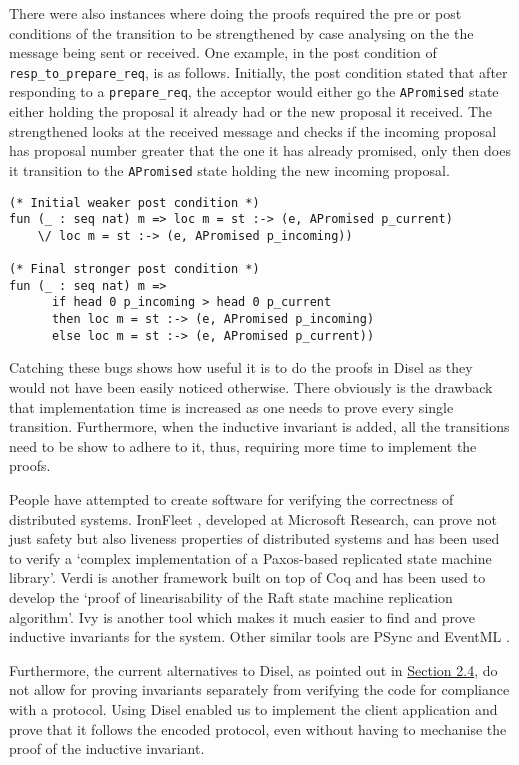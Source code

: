 There were also instances where doing the proofs required the pre
or post conditions of the transition to
be strengthened by case analysing on the the message being sent or received.
One example, in the post condition of \texttt{resp\_to\_prepare\_req}, is as follows. Initially,
the post condition stated that after responding to a \texttt{prepare\_req},
the acceptor would either go the \texttt{APromised} state either holding the
proposal it already had or the new proposal it received. The strengthened
looks at the received message and checks if the incoming proposal has proposal
number greater that the one it has already promised, only then does it transition
to the \texttt{APromised} state holding the new incoming proposal.

\begin{lstlisting}
(* Initial weaker post condition *)
fun (_ : seq nat) m => loc m = st :-> (e, APromised p_current)
    \/ loc m = st :-> (e, APromised p_incoming))

(* Final stronger post condition *)
fun (_ : seq nat) m =>
      if head 0 p_incoming > head 0 p_current
      then loc m = st :-> (e, APromised p_incoming)
      else loc m = st :-> (e, APromised p_current))
\end{lstlisting}

Catching these bugs shows how useful it is to do the proofs in Disel as they
would not have been easily noticed otherwise.
There obviously is the drawback that implementation time is increased as one
needs to prove every single transition. Furthermore, when the inductive
invariant is added, all the transitions need to be show to adhere to it,
thus, requiring more time to implement the proofs.

People have attempted to create software for verifying the correctness of distributed
systems. IronFleet \cite{15}, developed at Microsoft Research, can prove not just
safety but also liveness properties of distributed systems and has been used
to verify a `complex implementation of a Paxos-based replicated state machine
library'. Verdi \cite{16} is another framework built on top of Coq and has been used
to develop the `proof of linearisability of the Raft state machine replication
algorithm'. Ivy \cite{19} is another tool which makes it much easier to find and
prove inductive invariants for the system. Other similar tools are PSync \cite{17}
and EventML \cite{18}.

Furthermore, the current alternatives to Disel, as pointed out in
\hyperref[sec:relatedWork]{Section 2.4}, do not allow for proving invariants
separately from verifying the code for compliance with a protocol. Using
Disel enabled us to implement the client application and prove that it
follows the encoded protocol, even without having to mechanise the proof of the
inductive invariant.


